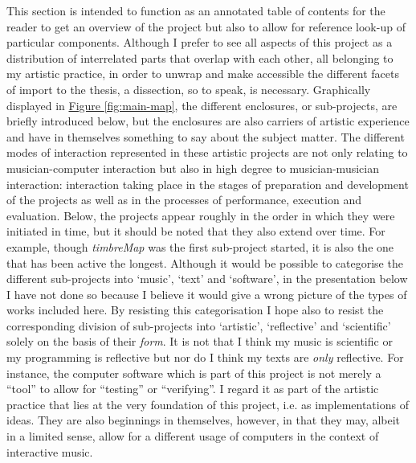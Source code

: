 This section is intended to function as an annotated table of contents for the reader to get an overview of the project but also to allow for reference look-up of particular components. Although I prefer to see all aspects of this project as a distribution of interrelated parts that overlap with each other, all belonging to my artistic practice, in order to unwrap and make accessible the different facets of import to the thesis, a dissection, so to speak, is necessary. Graphically displayed in \hyperlink{fig:target:main-map}{Figure \ref*{fig:main-map}}, the different enclosures, or sub-projects, are briefly introduced below, but the enclosures are also carriers of artistic experience and have in themselves something to say about the subject matter. The different modes of interaction represented in these artistic projects are not only relating to musician-computer interaction but also in high degree to musician-musician interaction: interaction taking place in the stages of preparation and development of the projects as well as in the processes of performance, execution and evaluation. Below, the projects appear roughly in the order in which they were initiated in time, but it should be noted that they also extend over time. For example, though \emph{timbreMap} was the first sub-project started, it is also the one that has been active the longest. Although it would be possible to categorise the different sub-projects into `music', `text' and `software', in the presentation below I have not done so because I believe it would give a wrong picture of the types of works included here. By resisting this categorisation I hope also to resist the corresponding division of sub-projects into `artistic', `reflective' and `scientific' solely on the basis of their \emph{form}. It is not that I think my music is scientific or my programming is reflective but nor do I think my texts are \emph{only} reflective. For instance, the computer software which is part of this project is not merely a ``tool'' to allow for ``testing'' or ``verifying''. I regard it as part of the artistic practice that lies at the very foundation of this project, i.e. as implementations of ideas. They are also beginnings in themselves, however, in that they may, albeit in a limited sense, allow for a different usage of computers in the context of interactive music.

